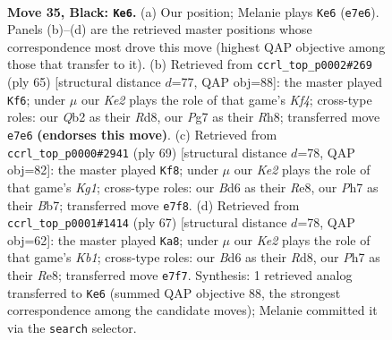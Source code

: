 \documentclass[11pt]{article}
\begin{document}
\clearpage

\begin{figure}[p]\centering
\begin{subfigure}{0.46\textwidth}\centering
\resizebox{\linewidth}{!}{%
\newchessgame
\chessboard[
  setfen={r6r/p3k1pp/3b4/n2p2Q1/p2P2PP/4P2K/1q1N4/2R5 b - - 3 35},
  showmover=false,
  pgfstyle=straightmove, color=movearrow, markmove={e7-e6}
]}
\caption{}
\end{subfigure}\hfill
\begin{subfigure}{0.46\textwidth}\centering
\resizebox{\linewidth}{!}{%
\newchessgame
\chessboard[
  setfen={3r3r/5p1p/2p5/2N1pk2/5b2/6RQ/PPP1KP1P/q7 b - - 15 33},
  showmover=false,
  pgfstyle=straightmove, color=movearrow, markmove={f5-f6}
]}
\caption{}
\end{subfigure}
\\[4pt]
\begin{subfigure}{0.46\textwidth}\centering
\resizebox{\linewidth}{!}{%
\newchessgame
\chessboard[
  setfen={4r1k1/1b6/p3p1Q1/1pq5/8/P1N2nP1/1PP1R3/2K5 b - - 6 35},
  showmover=false,
  pgfstyle=straightmove, color=movearrow, markmove={g8-f8}
]}
\caption{}
\end{subfigure}\hfill
\begin{subfigure}{0.46\textwidth}\centering
\resizebox{\linewidth}{!}{%
\newchessgame
\chessboard[
  setfen={1k1rr3/p7/1p2p3/1P2Q1pp/3P4/1q4P1/5PP1/2R1N1K1 b - - 1 34},
  showmover=false,
  pgfstyle=straightmove, color=movearrow, markmove={b8-a8}
]}
\caption{}
\end{subfigure}
\caption{\textbf{Move 35, Black: \texttt{Ke6}.} (a) Our position; Melanie plays \texttt{Ke6} (\texttt{e7e6}). Panels (b)--(d) are the retrieved master positions whose correspondence most drove this move (highest QAP objective among those that transfer to it). (b) Retrieved from \texttt{ccrl\_top\_p0002\#269} (ply 65) [structural distance $d$=77, QAP obj=88]: the master played \texttt{Kf6}; under $\mu$ our \emph{Ke2} plays the role of that game's \emph{Kf4}; cross-type roles: our \emph{Q}b2 as their \emph{R}d8, our \emph{P}g7 as their \emph{R}h8; transferred move \texttt{e7e6} \textbf{(endorses this move)}. (c) Retrieved from \texttt{ccrl\_top\_p0000\#2941} (ply 69) [structural distance $d$=78, QAP obj=82]: the master played \texttt{Kf8}; under $\mu$ our \emph{Ke2} plays the role of that game's \emph{Kg1}; cross-type roles: our \emph{B}d6 as their \emph{R}e8, our \emph{P}h7 as their \emph{B}b7; transferred move \texttt{e7f8}. (d) Retrieved from \texttt{ccrl\_top\_p0001\#1414} (ply 67) [structural distance $d$=78, QAP obj=62]: the master played \texttt{Ka8}; under $\mu$ our \emph{Ke2} plays the role of that game's \emph{Kb1}; cross-type roles: our \emph{B}d6 as their \emph{R}d8, our \emph{P}h7 as their \emph{R}e8; transferred move \texttt{e7f7}. Synthesis: 1 retrieved analog transferred to \texttt{Ke6} (summed QAP objective 88, the strongest correspondence among the candidate moves); Melanie committed it via the \texttt{search} selector.}
\label{fig:thought-m69}
\end{figure}
\end{document}
